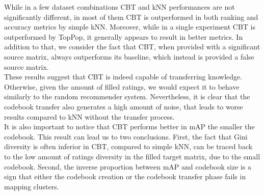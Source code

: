 While in a few dataset combinations CBT and kNN performances are not significantly different, in most of them CBT is outperformed in both ranking and accuracy metrics by simple kNN. Moreover, while in a single experiment CBT is outperformed by TopPop, it generally appears to result in better metrics. In addition to that, we consider the fact that CBT, when provided with a significant source matrix, always outperforms its baseline, which instead is provided a false source matrix.\\
These results suggest that CBT is indeed capable of transferring knowledge. Otherwise, given the amount of filled ratings, we would expect it to behave similarly to the random recommender system. Nevertheless, it is clear that the codebook transfer also generates a high amount of noise, that leads to worse results compared to kNN without the transfer process.\\
It is also important to notice that CBT performs better in mAP the smaller the codebook. This result can lead us to two conclusions. First, the fact that Gini diversity is often inferior in CBT, compared to simple kNN, can be traced back to the low amount of ratings diversity in the filled target matrix, due to the small codebook. Second, the inverse proportion between mAP and codebook size is a sign that either the codebook creation or the codebook transfer phase fails in mapping clusters.